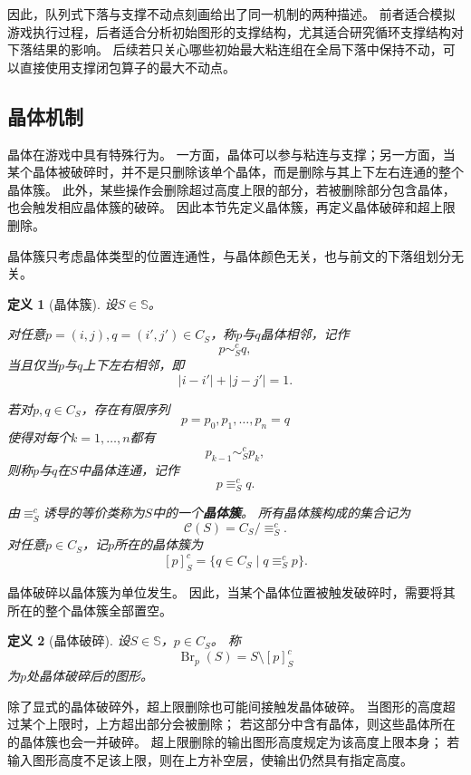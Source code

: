 \documentclass[UTF8,fontset=none]{ctexart}
\theoremstyle{cnthm}
\newtheorem{definition}{定义}[section]
\begin{document}
			因此，队列式下落与支撑不动点刻画给出了同一机制的两种描述。
			前者适合模拟游戏执行过程，后者适合分析初始图形的支撑结构，尤其适合研究循环支撑结构对下落结果的影响。
			后续若只关心哪些初始最大粘连组在全局下落中保持不动，可以直接使用支撑闭包算子的最大不动点。
			
		\subsection{晶体机制}
			
			晶体在游戏中具有特殊行为。
			一方面，晶体可以参与粘连与支撑；另一方面，当某个晶体被破碎时，并不是只删除该单个晶体，而是删除与其上下左右连通的整个晶体簇。
			此外，某些操作会删除超过高度上限的部分，若被删除部分包含晶体，也会触发相应晶体簇的破碎。
			因此本节先定义晶体簇，再定义晶体破碎和超上限删除。
			
			晶体簇只考虑晶体类型的位置连通性，与晶体颜色无关，也与前文的下落组划分无关。
			
			\begin{definition}[晶体簇]
				设$S\in\mathbb{S}$。
				
				对任意$p=(i,j),q=(i',j')\in C_S$，称$p$与$q$晶体相邻，记作
				$$
				p\sim^{c}_S q,
				$$
				当且仅当$p$与$q$上下左右相邻，即
				$$
				|i-i'|+|j-j'|=1.
				$$
				
				若对$p,q\in C_S$，存在有限序列
				$$
				p=p_0,p_1,\dots,p_n=q
				$$
				使得对每个$k=1,\dots,n$都有
				$$
				p_{k-1}\sim^{c}_S p_k,
				$$
				则称$p$与$q$在$S$中晶体连通，记作
				$$
				p\equiv^{c}_S q.
				$$
				
				由$\equiv^{c}_S$诱导的等价类称为$S$中的一个\textbf{晶体簇}。
				所有晶体簇构成的集合记为
				$$
				\mathcal{C}(S)=C_S/{\equiv^{c}_S}.
				$$
				对任意$p\in C_S$，记$p$所在的晶体簇为
				$$
				[p]^c_S=\{q\in C_S\mid q\equiv^c_S p\}.
				$$
			\end{definition}
			
			晶体破碎以晶体簇为单位发生。
			因此，当某个晶体位置被触发破碎时，需要将其所在的整个晶体簇全部置空。
			
			\begin{definition}[晶体破碎]
				设$S\in\mathbb{S}$，$p\in C_S$。
				称
				$$
				\operatorname{Br}_p(S)
				=
				S\setminus [p]^c_S
				$$
				为$p$处晶体破碎后的图形。
			\end{definition}
			
			除了显式的晶体破碎外，超上限删除也可能间接触发晶体破碎。
			当图形的高度超过某个上限时，上方超出部分会被删除；
			若这部分中含有晶体，则这些晶体所在的晶体簇也会一并破碎。
			超上限删除的输出图形高度规定为该高度上限本身；
			若输入图形高度不足该上限，则在上方补空层，使输出仍然具有指定高度。
			
\end{document}
